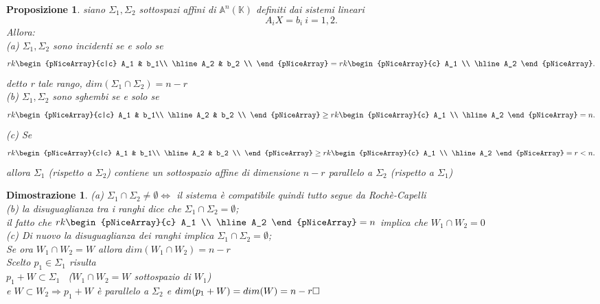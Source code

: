 \documentclass[12px]{article}
\theoremstyle{break}
\theoremstyle{break}
\theoremstyle{break}
\theoremstyle{break}
\newtheorem{propo}{Proposizione}
\theoremstyle{break}
\newtheorem*{dimo}{Dimostrazione}
\theoremstyle{break}
\newenvironment{prop}
  {\begin{mdframed}\begin{propo}}
  {\end{propo}\end{mdframed}}
\begin{document}
\newpage
\begin{prop}
	siano $\Sigma_1, \Sigma_2$ sottospazi affini di $\mathbb{A}^n(\mathbb{K})$ definiti dai sistemi lineari \[
	A_iX = b_i \ i = 1,2
	.\]
	Allora:\\
	(a) $\Sigma_1, \Sigma_2$ sono incidenti se e solo se \[
		rk\begin{pNiceArray}{c|c}
			A_1 & b_1\\
			\hline
			A_2 & b_2 \\
			\end{pNiceArray} = rk \begin{pNiceArray}{c}
				A_1 \\
				\hline
				A_2
			\end{pNiceArray}
	.\] 
	detto r tale rango, $dim(\Sigma_1\cap\Sigma_2) = n-r$\\
	(b) $\Sigma_1, \Sigma_2$ sono sghembi se e solo se \[
		rk\begin{pNiceArray}{c|c}
			A_1 & b_1\\
			\hline
			A_2 & b_2 \\
			\end{pNiceArray} \geq rk \begin{pNiceArray}{c}
				A_1 \\
				\hline
				A_2
			\end{pNiceArray} = n
	.\] 
	(c) Se\[
		rk\begin{pNiceArray}{c|c}
			A_1 & b_1\\
			\hline
			A_2 & b_2 \\
			\end{pNiceArray} \geq rk \begin{pNiceArray}{c}
				A_1 \\
				\hline
				A_2
			\end{pNiceArray} = r < n
	.\] 
	allora $\Sigma_1$ (rispetto a $\Sigma_2$) contiene un sottospazio affine di dimensione $n-r$ parallelo a $\Sigma_2$ (rispetto a $\Sigma_1$)
\end{prop}
\begin{dimo}
	(a) $\Sigma_1 \cap\Sigma_2 \neq \emptyset \Leftrightarrow$ il  sistema è compatibile quindi tutto segue da Rochè-Capelli\\[10px]
	(b) la disuguaglianza tra i ranghi dice che $\Sigma_1\cap\Sigma_2 = \emptyset$;\\ il fatto che $rk \begin{pNiceArray}{c}
		A_1 \\
		\hline
		A_2
	\end{pNiceArray} = n$ implica che $W_1\cap W_2 = {0}$\\
(c) Di nuovo la disuguaglianza dei  ranghi implica $\Sigma_1\cap\Sigma_2 = \emptyset$;\\
Se ora $W_1\cap W_2 = W$ allora $dim(W_1\cap W_2) = n - r$\\
Scelto $p_1 \in \Sigma_1$ risulta\\
$p_1 + W \subset\Sigma_1$ \ ($W_1 \cap W_2 = W$ sottospazio di $W_1$)\\
e $W \subset W_2 \Rightarrow p_1 + W$ è parallelo a $\Sigma_2$ e $dim(p_1 + W) = dim(W) = n - r \hfill\square$
\end{dimo}
\end{document}
